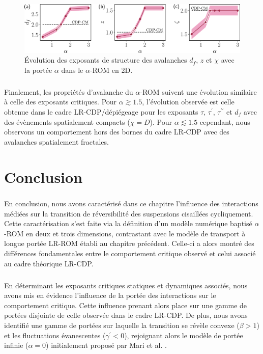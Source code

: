 \begin{figure}[h]
	\centering
	\includegraphics[width=\textwidth]{Chapitre3/Figures/Avalanches/Recap_AvSuspensions.pdf}
	\caption{Évolution des exposants de structure des avalanches $d_f$, $z$ et $\chi$ avec la portée $\alpha$ dans le $\alpha$-ROM en 2D.}
	\label{fig:EvolAvSusp}
\end{figure}

\subparagraph{}Finalement, les propriétés d'avalanche du $\alpha$-ROM suivent une évolution similaire à celle des exposants critiques. Pour $\alpha \gtrsim 1.5$, l'évolution observée est celle obtenue dans le cadre LR-CDP/dépiégeage pour les exposants $\tau$, $\tau^\prime$, $\tau^{\prime\prime}$ et $d_f$ avec des évènements spatialement compacts ($\chi=D$). Pour $\alpha\lesssim 1.5$ cependant, nous observons un comportement hors des bornes du cadre LR-CDP avec des avalanches spatialement fractales.

\section{Conclusion}

\subparagraph{}En conclusion, nous avons caractérisé dans ce chapitre l'influence des interactions médiées sur la transition de réversibilité des suspensions cisaillées cycliquement. Cette caractérisation s'est faite via la définition d'un modèle numérique baptisé $\alpha$-ROM en deux et trois dimensions, contrastant avec le modèle de transport à longue portée LR-ROM établi au chapitre précédent. Celle-ci a alors montré des différences fondamentales entre le comportement critique observé et celui associé au cadre théorique LR-CDP.

\subparagraph{}En déterminant les exposants critiques statiques et dynamiques associés, nous avons mis en évidence l'influence de la portée des interactions sur le comportement critique. Cette influence prenant alors place sur une gamme de portées disjointe de celle observée dans le cadre LR-CDP. De plus, nous avons identifié une gamme de portées sur laquelle la transition se révèle convexe ($\beta >1$) et les fluctuations évanescentes ($\gamma^\prime < 0$), rejoignant alors le modèle de portée infinie ($\alpha=0$) initialement proposé par Mari et al. \cite{mari_absorbing_2022}.

